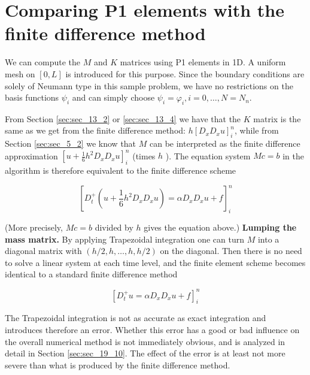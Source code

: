 \documentclass[../main.tex]{subfiles}
\begin{document}
	\section[Comparing P1 elements with the finite difference method]{Comparing P1 elements with the finite difference method}
		\label{sec:sec_19_6}
		
		\noindent We can compute the $M$ and $K$ matrices using P1 elements in 1D. A uniform mesh on $[0, L]$ is introduced for this purpose. Since the boundary conditions are solely of Neumann type in this sample problem, we have no restrictions on the basis functions $\psi_{i}$ and can simply choose $\psi_{i}=\varphi_{i}, i=0, \ldots, N=N_{n}$.
		
		From Section \ref{sec:sec_13_2} or \ref{sec:sec_13_4} we have that the $K$ matrix is the same as we get from the finite difference method: $h\left[D_{x} D_{x} u\right]_{i}^{n}$, while from Section \ref{sec:sec_5_2} we know that $M$ can be interpreted as the finite difference approximation $\left[u+\frac{1}{6} h^{2} D_{x} D_{x} u\right]_{i}^{n}$ (times $h$ ). The equation system $M c=b$ in the algorithm is therefore equivalent to the finite difference scheme
		
		\begin{equation}
		\label{eqa227}	
			\left[D_{t}^{+}\left(u+\frac{1}{6} h^{2} D_{x} D_{x} u\right)=\alpha D_{x} D_{x} u+f\right]_{i}^{n}
		\end{equation}
	
		(More precisely, $M c=b$ divided by $h$ gives the equation above.)\smallbreak
		\noindent \textbf{Lumping the mass matrix.   } By applying Trapezoidal integration one can turn $M$ into a diagonal matrix with $(h / 2, h, \ldots, h, h / 2)$ on the diagonal. Then there is no need to solve a linear system at each time level, and the finite element scheme becomes identical to a standard finite difference method
		
		\begin{equation}
		\label{eqa228}	
			\left[D_{t}^{+} u=\alpha D_{x} D_{x} u+f\right]_{i}^{n}
		\end{equation}
		
		\noindent The Trapezoidal integration is not as accurate as exact integration and introduces therefore an error. Whether this error has a good or bad influence on the overall numerical method is not immediately obvious, and is analyzed in detail in Section \ref{sec:sec_19_10}. The effect of the error is at least not more severe than what is produced by the finite difference method.
		
\end{document}
